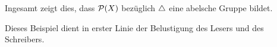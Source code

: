 Ingesamt zeigt dies, dass $\mathcal{P}(X)$ bezüglich $\bigtriangleup$ eine abelsche Gruppe bildet.


\begin{bem}
 Dieses Beispiel dient in erster Linie der Belustigung des Lesers und des Schreibers.
\end{bem}






%   





